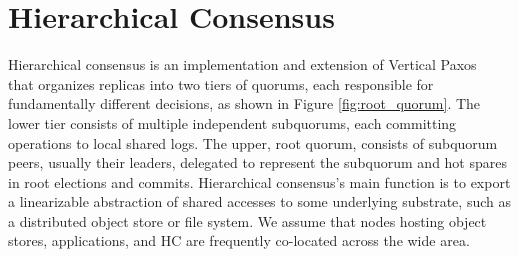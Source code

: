 \documentclass[sigplan,screen,review,anonymous,nonacm]{acmart}
\begin{document}



\section{Hierarchical Consensus}

Hierarchical consensus is an implementation and extension of Vertical 
Paxos~\cite{vertical_paxos} that organizes replicas into two tiers of 
quorums, each responsible for fundamentally different decisions, as shown 
in Figure \ref{fig:root_quorum}.
The lower tier consists of multiple independent subquorums, each committing 
operations to local shared logs. 
The upper, root quorum, consists of subquorum peers, usually their leaders, 
delegated to represent the subquorum and hot spares in root elections and 
commits. 
Hierarchical consensus's main function is to export a linearizable abstraction 
of shared accesses to some underlying substrate, such as a distributed 
object store or file system. 
We assume that nodes hosting object stores, applications, and HC are 
frequently co-located across the wide area.
\end{document}
